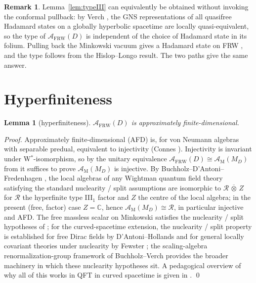\documentclass[11pt]{article}
\newtheorem{lemma}[theorem]{Lemma}
\theoremstyle{definition}
\newtheorem{remark}[theorem]{Remark}
\newcommand{\C}{\mathbb{C}}
\renewcommand{\AA}{\mathcal{A}}
\newcommand{\RR}{\mathcal{R}}
\newcommand{\FRW}{\mathrm{FRW}}
\newcommand{\Mink}{\mathrm{M}}
\begin{document}
\begin{remark}\label{rmk:pure-AQFT}
Lemma~\ref{lem:typeIII} can equivalently be obtained without invoking the
conformal pullback: by Verch \cite{Verch1994}, the GNS representations of all
quasifree Hadamard states on a globally hyperbolic spacetime are locally
quasi-equivalent, so the type of $\AA_\FRW(D)$ is independent of the choice
of Hadamard state in its folium. Pulling back the Minkowski vacuum gives a
Hadamard state on FRW \cite[Eq.~(2.3)]{FrwNote2026}, and the type follows
from the Hislop--Longo result. The two paths give the same answer.
\end{remark}

\section{Hyperfiniteness}\label{sec:hyperfinite}

\begin{lemma}[hyperfiniteness]\label{lem:AFD}
$\AA_\FRW(D)$ is approximately finite-dimensional.
\end{lemma}

\begin{proof}
Approximately finite-dimensional (AFD) is, for von Neumann algebras with
separable predual, equivalent to injectivity (Connes \cite{Connes1976}).
Injectivity is invariant under W$^*$-isomorphism, so by the unitary
equivalence $\AA_\FRW(D)\cong\AA_\Mink(M_D)$ from
\cite[Prop.~3.2]{FrwNote2026} it suffices to prove
$\AA_\Mink(M_D)$ is injective. By Buchholz--D'Antoni--Fredenhagen
\cite{BDF1987}, the local algebras of any Wightman quantum field theory
satisfying the standard nuclearity / split assumptions are isomorphic to
$\RR\,\overline{\otimes}\,Z$ for $\RR$ the hyperfinite type III$_1$ factor
and $Z$ the centre of the local algebra; in the present (free, factor)
case $Z=\C$, hence $\AA_\Mink(M_D)\cong\RR$, in particular injective and AFD.
The free massless scalar on Minkowski satisfies the nuclearity / split
hypotheses of \cite{BDF1987}; for the curved-spacetime extension, the
nuclearity / split property is established for free Dirac fields by
D'Antoni--Hollands \cite{DAntoniHollands2006} and for general locally
covariant theories under nuclearity by Fewster \cite{Fewster2015Split};
the scaling-algebra renormalization-group framework of Buchholz--Verch
\cite{BuchholzVerch1995} provides the broader machinery in which these
nuclearity hypotheses sit. A pedagogical overview of why all of this
works in QFT in curved spacetime is given in
\cite{Witten2022WhyQFT}.
\qed
\end{proof}
\end{document}
